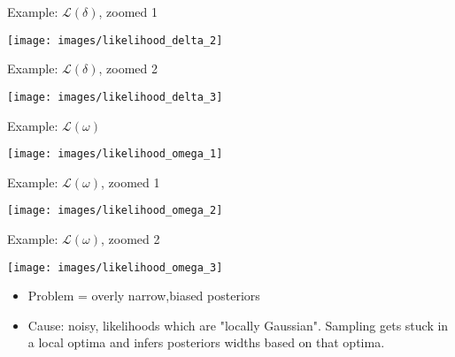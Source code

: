 \documentclass[10pt]{beamer}
\begin{document}
\begin{frame}{}
	
	Example: $\mathcal{L}(\delta)$, zoomed 1
	
	\texttt{[image: images/likelihood\_delta\_2]}
	
	
\end{frame}


\begin{frame}{}
	
	Example: $\mathcal{L}(\delta)$, zoomed 2
	
	\texttt{[image: images/likelihood\_delta\_3]}
	
	
\end{frame}


\begin{frame}{}
	
	Example: $\mathcal{L}(\omega)$
	
	\texttt{[image: images/likelihood\_omega\_1]}

	
\end{frame}


\begin{frame}{}
	
	Example: $\mathcal{L}(\omega)$, zoomed 1
	
	\texttt{[image: images/likelihood\_omega\_2]}
	
	
\end{frame}


\begin{frame}{}
	
	Example: $\mathcal{L}(\omega)$, zoomed 2
	
	\texttt{[image: images/likelihood\_omega\_3]}
	
	
\end{frame}






\begin{frame}{}
	
		\begin{itemize}
		\item \alert{Problem} = overly narrow,biased posteriors
		\item Cause: noisy, likelihoods which are "locally Gaussian". Sampling gets stuck in a local optima and infers posteriors widths based on that optima. 

	\end{itemize}
	
	
	
\end{frame}
\end{document}

